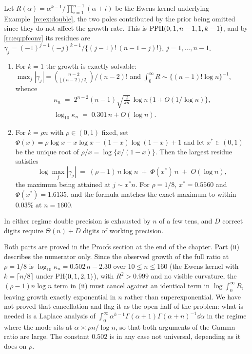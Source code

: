 \begin{proposition}\label{rc:prop:cond}
Let $R(\alpha)=\alpha^{k-1}/\prod_{i=1}^{n-1}(\alpha+i)$ be the Ewens kernel underlying Example~\ref{rc:ex:double}, the two poles contributed by the prior being omitted since they do not affect the growth rate. This is $\mathrm{PPH}(0,1,n-1,1,k-1)$, and by \eqref{rc:eq:pfconv} its residues are $\gamma_j=(-1)^{j-1}(-j)^{k-1}/\{(j-1)!\,(n-1-j)!\}$, $j=1,\dots,n-1$.
\begin{enumerate}[label=(\roman*)]
\item For $k=1$ the growth is exactly solvable: $\max_j|\gamma_j|=\binom{n-2}{\lfloor(n-2)/2\rfloor}/(n-2)!$ and $\int_0^\infty R\sim\{(n-1)!\log n\}^{-1}$, whence
\[
\begin{gathered}
\kappa_n\;=\;2^{n-2}(n-1)\sqrt{\frac{2}{\pi n}}\,\log n\,\{1+O(1/\log n)\},\\
\log_{10}\kappa_n\;=\;0.301\,n+O(\log n).
\end{gathered}
\]
\item For $k=\rho n$ with $\rho\in(0,1)$ fixed, set $\Phi(x)=\rho\log x-x\log x-(1-x)\log(1-x)+1$ and let $x^*\in(0,1)$ be the unique root of $\rho/x=\log\{x/(1-x)\}$. Then the largest residue satisfies
\[
\log\max_j|\gamma_j|\;=\;(\rho-1)\,n\log n\;+\;\Phi(x^*)\,n\;+\;O(\log n),
\]
the maximum being attained at $j\sim x^*n$. For $\rho=1/8$, $x^*=0.5560$ and $\Phi(x^*)=1.6135$, and the formula matches the exact maximum to within $0.03\%$ at $n=1600$.
\end{enumerate}
In either regime double precision is exhausted by $n$ of a few tens, and $D$ correct digits require $\Theta(n)+D$ digits of working precision.
\end{proposition}

Both parts are proved in the Proofs section at the end of the chapter. Part (ii) describes the numerator only. Since the observed growth of the full ratio at $\rho=1/8$ is $\log_{10}\kappa_n=0.502\,n-2.30$ over $10\le n\le160$ (the Ewens kernel with $k=\lceil n/8\rceil$ under $\mathrm{PH}(0,1,2,1)$), with $R^2>0.999$ and no visible curvature, the $(\rho-1)n\log n$ term in (ii) must cancel against an identical term in $\log\int_0^\infty R$, leaving growth exactly exponential in $n$ rather than superexponential. We have not proved that cancellation and flag it as the open half of the problem: what is needed is a Laplace analysis of $\int_0^\infty\alpha^{k-1}\Gamma(\alpha+1)\Gamma(\alpha+n)^{-1}\dd\alpha$ in the regime where the mode sits at $\alpha\asymp\rho n/\log n$, so that both arguments of the Gamma ratio are large. The constant $0.502$ is in any case not universal, depending as it does on $\rho$.

